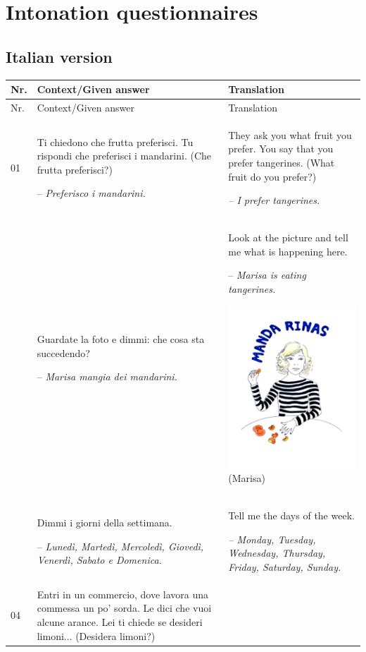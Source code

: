 \chapter{Intonation questionnaires}\label{app:a}
\section{Italian version}\label{app:a1}

\begin{xltabular}{\textwidth}{lQQ}
\lsptoprule Nr. & Context\slash Given answer & Translation\\\midrule\endfirsthead
\midrule Nr. & Context\slash Given answer & Translation\\\midrule\endhead
\endfoot\lspbottomrule\endlastfoot

01 & Ti chiedono che frutta preferisci. Tu rispondi che preferisci i mandarini. (Che frutta preferisci?)

-- \textit{Preferisco i mandarini.} & They ask you what fruit you prefer. You say that you prefer tangerines. (What fruit do you prefer?)

{\itshape -- I prefer tangerines.}\\
 & Guardate la foto e dimmi: che cosa sta succedendo?

-- \textit{Marisa mangia dei mandarini.} & Look at the picture and tell me what is happening here.

-- \textit{Marisa is eating tangerines.}

\includegraphics[width=.3\textwidth]{figures/a08HabilAppendix-img001.png}
 (Marisa)\\
 & Dimmi i giorni della settimana.

-- \textit{Lunedì, Martedì, Mercoledì, Giovedì, Venerdì, Sabato e Domenica.} & Tell me the days of the week.

{\itshape -- Monday, Tuesday, Wednesday, Thursday, Friday, Saturday, Sunday.}\\
04 & Entri in un commercio, dove lavora una commessa un po' sorda. Le dici che vuoi alcune arance. Lei ti chiede se desideri limoni... (Desidera limoni?)


\end{xltabular}
